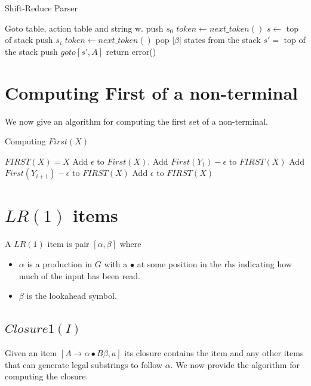 \documentclass[•]{book}
\begin{document}
\begin{algorithm}
\caption{Shift-Reduce Parser}
\begin{algorithmic}
\REQUIRE Goto table, action table and string w. 
\STATE push $s_0$
\STATE $token \leftarrow next\_token()$ 
\STATE $s \leftarrow $ top of stack
\STATE push $s_i$
\STATE $token \leftarrow next\_token()$ 
\STATE pop $|\beta|$ states from the stack
\STATE $s' = $ top of the stack
\STATE push $goto[s',A]$
\STATE return
\ELSE
\STATE error()
\ENDIF
\ENDWHILE
\end{algorithmic}
\end{algorithm}

\section{Computing First of a non-terminal}
We now give an algorithm for computing the first set of a non-terminal.

\begin{algorithm}
\caption{Computing $First(X)$}
\begin{algorithmic}
\STATE $FIRST(X) = X$
\ENDIF
{}
\STATE Add $\epsilon$ to $First(X)$.
\ENDIF
{}
\STATE Add $First(Y_1) - \epsilon$ to $FIRST(X)$
\STATE Add $First(Y_{i+1}) - \epsilon$ to $FIRST(X)$
\ENDIF
\ENDFOR
{}
\STATE Add $\epsilon$ to $FIRST(X)$
\ENDIF
\ENDIF
\end{algorithmic}
\end{algorithm}

\section{$LR(1)$ items}

A $LR(1)$ item is pair $[\alpha,\beta]$ where 
\begin{itemize}
\item $\alpha$ is a production in $G$ with a $\bullet$ at some position in the rhs indicating how much of the input has been read.
\item $\beta$ is the lookahead symbol.
\end{itemize}

\subsection{$Closure1(I)$}
Given an item $[A \rightarrow \alpha \bullet B \beta, a]$ its closure contains the item and any other items that can generate legal substrings to follow $\alpha$. We now provide the algorithm for computing the closure.
\end{document}
